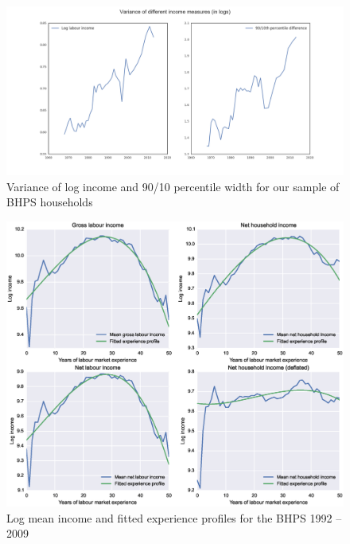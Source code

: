 \begin{figure}
\includegraphics[width=\columnwidth]{PSID_incvar}
\caption{Variance of log income and 90/10 percentile width for our sample of
BHPS households}
\label{fig:psid_incvar}
\end{figure}

\begin{figure}
\includegraphics[width=\columnwidth]{BHPS_fitted_profiles}
\caption{Log mean income and fitted experience profiles for the BHPS 1992 
-- 2009}
\label{fig:bhps_profiles}
\end{figure}


